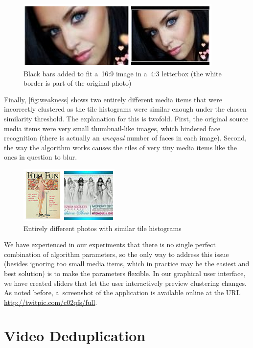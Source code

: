 \begin{figure}[!ht]
  \centering
  \includegraphics[width=0.55\linewidth]{./bwtolerance.png}
  \caption[Black bars added to fit a~16:9 image in a~4:3 letterbox]
    {Black bars added to fit a~16:9 image in a~4:3 letterbox
    (the white border is part of the original photo)}
  \label{fig:bwtolerance}
\end{figure}

Finally, \autoref{fig:weakness} shows two entirely different media items
that were incorrectly clustered as the tile histograms
were similar enough under the chosen similarity threshold.
The explanation for this is twofold.
First, the original source media items were very small thumbnail-like images,
which hindered face recognition
(there is actually an \emph{unequal} number of faces in each image).
Second, the way the algorithm works
causes the tiles of very tiny media items like the ones in question to blur.

\begin{figure}[!ht]
  \centering
  \includegraphics[width=0.4\linewidth]{./weakness.png}
  \caption{Entirely different photos with similar tile histograms}
  \label{fig:weakness}
\end{figure}

We have experienced in our experiments that there is no single perfect
combination of algorithm parameters,
so the only way to address this issue (besides ignoring too small media items,
which in practice may be the easiest and best solution)
is to make the parameters flexible.
In our graphical user interface, we have created sliders
that let the user interactively preview clustering changes.
As noted before, a~screenshot of the application
is available online at the URL \url{http://twitpic.com/c02qfs/full}.

\section{Video Deduplication}

